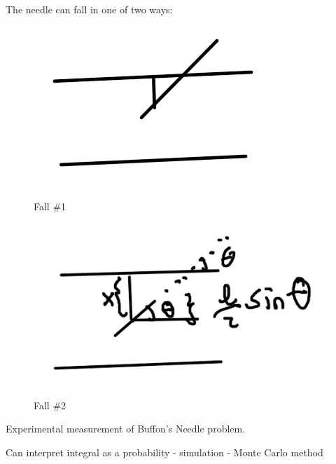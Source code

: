 \documentclass{article}
\begin{document}
The needle can fall in one of two ways:

\begin{figure}[h]
\centering
\begin{minipage}{.45\linewidth}
  \includegraphics[width=\linewidth]{images/L09/buffon1.jpeg}
  \caption{Fall \#1}
  \label{bufffon1}
\end{minipage}
\hspace{.05\linewidth}
\begin{minipage}{.45\linewidth}
  \includegraphics[width=\linewidth]{images/L09/buffon2.jpeg}
  \caption{Fall \#2}
  \label{bufffon2}
\end{minipage}
\end{figure}



Experimental measurement of Buffon's Needle problem.


Can interpret integral as a probability - simulation - Monte Carlo method
\end{document}
